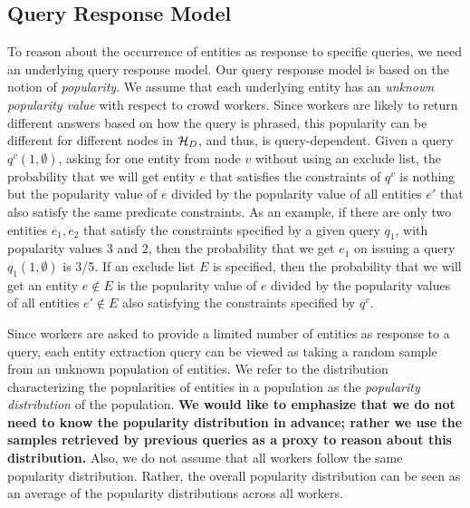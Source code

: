 \subsection{Query Response Model}
\label{sec:sampling}
To reason about the occurrence of entities as response to specific queries, we need an underlying query response model. Our query response model is based on the notion of {\em popularity}.
\ifpaper We assume that each underlying entity has an {\em unknown popularity value} with respect to crowd workers. Since workers are likely to return different answers based on how the query is phrased, this popularity can be different for different nodes in $\mathcal{H}_D$, and thus, is query-dependent. 
Given a query $q^v(1, \emptyset)$, asking for one entity from node $v$ without using an exclude list, the probability that we will get entity $e$ that satisfies the constraints of $q^v$ is nothing but the popularity value of $e$ divided by the popularity value of all entities $e'$ that also satisfy the same predicate constraints. As an example, if there are only two entities $e_1, e_2$ that satisfy the constraints specified by a given query $q_1$, with popularity values $3$ and $2$, then the probability that we get $e_1$ on issuing a query $q_1(1, \emptyset)$ is 3/5. If an exclude list $E$ is specified, then the probability that we will get an entity $e \notin E$ is the popularity value of $e$ divided by the popularity values of all entities $e' \notin E$ also satisfying the constraints specified by $q^v$. 

Since workers are asked to provide a limited number of entities as response to a query, each entity extraction query can be viewed as taking a random sample from an unknown population of entities. We refer to the distribution characterizing the popularities of entities in a population as the {\em popularity distribution} of the population. {\bf We would like to emphasize that we do not need to know the popularity distribution in advance; rather we use the samples retrieved by previous queries as a proxy to reason about this distribution.} Also, we do not assume that all workers follow the same popularity distribution. Rather, the overall popularity distribution can be seen as an average of the popularity distributions across all workers.

